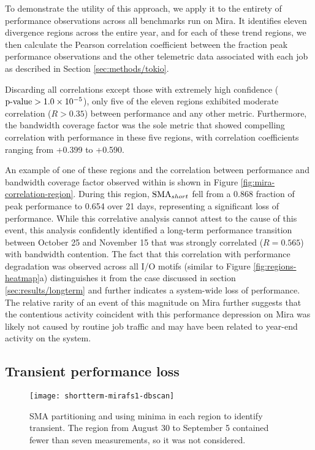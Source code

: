To demonstrate the utility of this approach, we apply it to the entirety of performance observations across all benchmarks run on Mira.
It identifies eleven divergence regions across the entire year, and for each of these trend regions, we then calculate the Pearson correlation coefficient between the fraction peak performance observations and the other telemetric data associated with each job as described in Section \ref{sec:methods/tokio}.

Discarding all correlations except those with extremely high confidence ($\textup{p-value} > {1.0 \times 10^{-5}}$), only five of the eleven regions exhibited moderate correlation ($R > 0.35$) between performance and any other metric.
Furthermore, the bandwidth coverage factor was the sole metric that showed compelling correlation with performance in these five regions, with correlation coefficients ranging from +0.399 to +0.590.

An example of one of these regions and the correlation between performance and bandwidth coverage factor observed within is shown in Figure \ref{fig:mira-correlation-region}.
During this region, $\textup{SMA}_{short}$ fell from a 0.868 fraction of peak performance to 0.654 over 21 days, representing a significant loss of performance.
While this correlative analysis cannot attest to the cause of this event, this analysis confidently identified a long-term performance transition between October 25 and November 15 that was strongly correlated ($R = 0.565$) with bandwidth contention.
The fact that this correlation with performance degradation was observed across all I/O motifs (similar to Figure \ref{fig:regions-heatmap}a) distinguishes it from the case discussed in section \ref{sec:results/longterm} and further indicates a system-wide loss of performance.
The relative rarity of an event of this magnitude on Mira further suggests that the contentious activity coincident with this performance depression on Mira was likely not caused by routine job traffic and may have been related to year-end activity on the system.







\subsection{Transient performance loss} \label{sec:results/shortterm}

\begin{figure}
    \centering
    \texttt{[image: shortterm-mirafs1-dbscan]}
    \vspace{-.35in}
    \caption{SMA partitioning and using minima in each region to identify transient.  The region from August 30 to September 5 contained fewer than seven measurements, so it was not considered.}
    \label{fig:shortterm-mirafs1-dbscan}
\end{figure}

